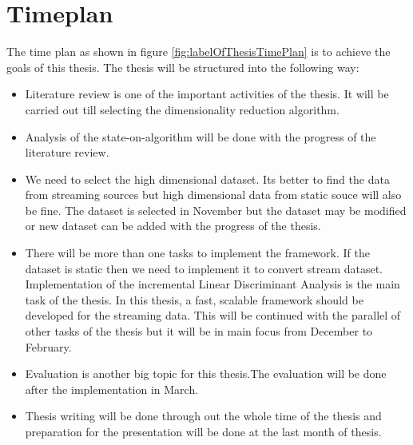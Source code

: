\chapter{Timeplan}
\label{cha:timeplan}

The time plan as shown in figure \ref{fig:labelOfThesisTimePlan} is to achieve the goals of this thesis. The thesis will be structured into the following way:
\begin{itemize}
	\item Literature review is one of the important activities of the thesis. It will be carried out till selecting the dimensionality reduction algorithm.
	\item Analysis of the state-on-algorithm will be done with the progress of the literature review.
	\item We need to select the high dimensional dataset. Its better to find the data from streaming sources but high dimensional data from static souce will also be fine. The dataset is selected in November but the dataset may be modified or new dataset can be added with the progress of the thesis. 
	\item There will be more than one tasks to implement the framework. If the dataset is static then we need to implement it to convert stream dataset. Implementation of the incremental Linear Discriminant Analysis is the main task of the thesis. In this thesis, a fast, scalable framework should be developed for the streaming data. This will be continued with the parallel of other tasks of the thesis but it will be in main focus from December to February.
	\item Evaluation is another big topic for this thesis.The evaluation will be done after the implementation in March.
	\item Thesis writing will be done through out the whole time of the thesis and preparation for the presentation will be done at the last month of thesis.
\end{itemize}

